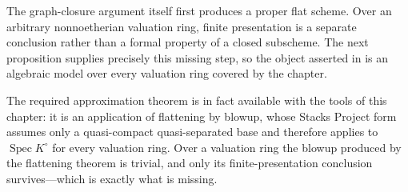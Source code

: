 \begin{remark}\label{rem:common-domination-finite-presentation}
The graph-closure argument itself first produces a proper flat scheme.  Over
an arbitrary nonnoetherian valuation ring, finite presentation is a separate
conclusion rather than a formal property of a closed subscheme.  The next
proposition supplies precisely this missing step, so the object asserted in
 is an algebraic model over every valuation
ring covered by the chapter.
\end{remark}

The required approximation theorem is in fact available with the tools of
this chapter: it is an application of flattening by blowup, whose
Stacks Project form \cite[Tag 0815]{stacks-project} assumes only a
quasi-compact quasi-separated base and therefore applies to
$\operatorname{Spec}K^\circ$ for every valuation ring.  Over a valuation
ring the blowup produced by the flattening theorem is trivial, and only its
finite-presentation conclusion survives---which is exactly what is missing.

